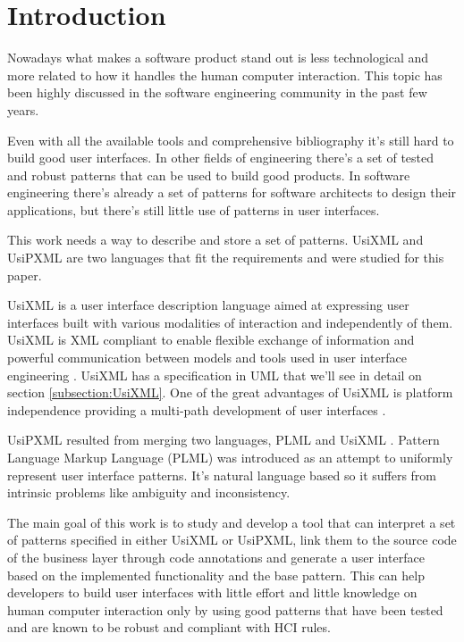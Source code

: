 \section{Introduction}
Nowadays what makes a software product stand out is less technological and more related to how it handles the human computer interaction. This topic has been highly discussed in the software engineering community in the past few years.

Even with all the available tools and comprehensive bibliography it's still hard to build good user interfaces. In other fields of engineering there's a set of tested and robust patterns that can be used to build good products. In software engineering there's already a set of patterns for software architects to design their applications, but there's still little use of patterns in user interfaces.

This work needs a way to describe and store a set of patterns. UsiXML and UsiPXML are two languages that fit the requirements and were studied for this paper.
 
UsiXML is a user interface description language aimed at expressing user interfaces built with various modalities of interaction and independently of them. UsiXML is XML compliant to enable flexible exchange of information and powerful communication between models and tools used in user interface engineering \cite{UsiXML_USer_Interface_eXtensible_Markup_Language}. UsiXML has a specification in UML that we'll see in detail on section \ref{subsection:UsiXML}. One of the great advantages of UsiXML is platform independence providing a multi-path development of user interfaces \cite{UsiXML_a_Language_Supporting_Multi-Path_Development_of_User_Interfaces}.


UsiPXML resulted from merging two languages, PLML \cite{Pattern_Language_Markup_Language} and UsiXML \cite{Different_kinds_of_pattern_support_for_interactive_systems}. Pattern Language Markup Language (PLML) was introduced as an attempt to uniformly represent user interface patterns. It's natural language based so it suffers from intrinsic problems like ambiguity and inconsistency.

The main goal of this work is to study and develop a tool that can interpret a set of patterns specified in either UsiXML or UsiPXML, link them to the source code of the business layer through code annotations and generate a user interface based on the implemented functionality and the base pattern. This can help developers to build user interfaces with little effort and little knowledge on human computer interaction only by using good patterns that have been tested and are known to be robust and compliant with HCI rules.

